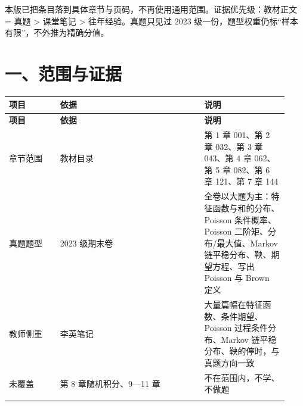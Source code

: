\documentclass[UTF8,a4paper,11pt]{ctexart}
\begin{document}
本版已把条目落到具体章节与页码，不再使用通用范围。证据优先级：教材正文 = 真题 > 课堂笔记 > 往年经验。真题只见过 2023 级一份，题型权重仍标“样本有限”，不外推为精确分值。

\section{一、范围与证据}
{\small\renewcommand{\arraystretch}{1.22}\setlength{\tabcolsep}{3.5pt}
\begin{longtable}{P{0.17\linewidth}P{0.48\linewidth}P{0.28\linewidth}}
\toprule
\bfseries 项目 & \bfseries 依据 & \bfseries 说明 \\
\midrule
\endfirsthead
\toprule
\bfseries 项目 & \bfseries 依据 & \bfseries 说明 \\
\midrule
\endhead
章节范围 & 教材目录 & 第 1 章 001、第 2 章 032、第 3 章 043、第 4 章 062、第 5 章 082、第 6 章 121、第 7 章 144 \\
\addlinespace[.15em]
真题题型 & 2023 级期末卷 & 全卷以大题为主：特征函数与和的分布、Poisson 条件概率、Poisson 二阶矩、分布/最大值、Markov 链平稳分布、鞅、期望方程、写出 Poisson 与 Brown 定义 \\
\addlinespace[.15em]
教师侧重 & 李英笔记 & 大量篇幅在特征函数、条件期望、Poisson 过程条件分布、Markov 链平稳分布、鞅的停时，与真题方向一致 \\
\addlinespace[.15em]
未覆盖 & 第 8 章随机积分、9—11 章 & 不在范围内，不学、不做题 \\
\addlinespace[.15em]
\bottomrule
\end{longtable}
}
\end{document}
